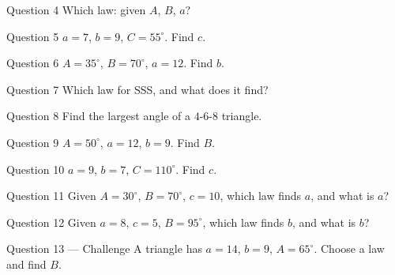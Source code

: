 \documentclass[11pt]{article}
\begin{document}
\begin{qbox}{Question 4}
Which law: given $A$, $B$, $a$?\workspace{1.8cm}
\end{qbox}

\begin{qbox}{Question 5}
$a=7$, $b=9$, $C=55^\circ$. Find $c$.\workspace{2.4cm}
\end{qbox}

\begin{qbox}{Question 6}
$A=35^\circ$, $B=70^\circ$, $a=12$. Find $b$.\workspace{2.4cm}
\end{qbox}

\begin{qbox}{Question 7}
Which law for SSS, and what does it find?\workspace{2.0cm}
\end{qbox}

\begin{qbox}{Question 8}
Find the largest angle of a $4$-$6$-$8$ triangle.\workspace{2.4cm}
\end{qbox}

\begin{qbox}{Question 9}
$A=50^\circ$, $a=12$, $b=9$. Find $B$.\workspace{2.4cm}
\end{qbox}

\begin{qbox}{Question 10}
$a=9$, $b=7$, $C=110^\circ$. Find $c$.\workspace{2.4cm}
\end{qbox}

\begin{qbox}{Question 11}
Given $A=30^\circ$, $B=70^\circ$, $c=10$, which law finds $a$, and what is $a$?\workspace{2.6cm}
\end{qbox}

\begin{qbox}{Question 12}
Given $a=8$, $c=5$, $B=95^\circ$, which law finds $b$, and what is $b$?\workspace{2.6cm}
\end{qbox}

\begin{qbox}{Question 13 --- Challenge}
A triangle has $a=14$, $b=9$, $A=65^\circ$. Choose a law and find $B$.\workspace{2.8cm}
\end{qbox}

\clearpage
{}
\end{document}
